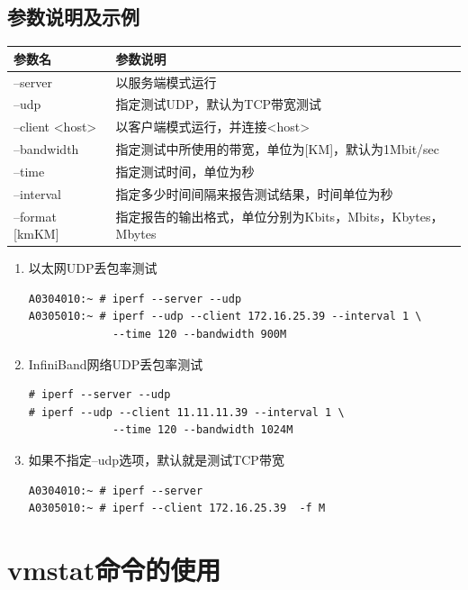 \subsection{参数说明及示例}

\begin{tabular}{lp{25em}}
  \toprule
  参数名       & 参数说明 \\
  \midrule
  --server	& 以服务端模式运行 \\
  --udp	        & 指定测试UDP，默认为TCP带宽测试 \\
  --client <host>	& 以客户端模式运行，并连接<host> \\
  --bandwidth	& 指定测试中所使用的带宽，单位为[KM]，默认为1Mbit/sec \\
  --time	        & 指定测试时间，单位为秒 \\
  --interval	& 指定多少时间间隔来报告测试结果，时间单位为秒 \\
  --format [kmKM]	& 指定报告的输出格式，单位分别为Kbits，Mbits，Kbytes，Mbytes \\
\bottomrule
\end{tabular}

\begin{enumerate}[itemsep=0pt,parsep=0pt]
\item 以太网UDP丢包率测试

\begin{verbatim}
A0304010:~ # iperf --server --udp 
A0305010:~ # iperf --udp --client 172.16.25.39 --interval 1 \
             --time 120 --bandwidth 900M
\end{verbatim}

\item InfiniBand网络UDP丢包率测试

\begin{verbatim}
# iperf --server --udp 
# iperf --udp --client 11.11.11.39 --interval 1 \
             --time 120 --bandwidth 1024M
\end{verbatim}

\item 如果不指定--udp选项，默认就是测试TCP带宽

\begin{verbatim}
A0304010:~ # iperf --server 
A0305010:~ # iperf --client 172.16.25.39  -f M
\end{verbatim}
\end{enumerate}

\section{vmstat命令的使用}
\label{sec:vmstatCmd}

